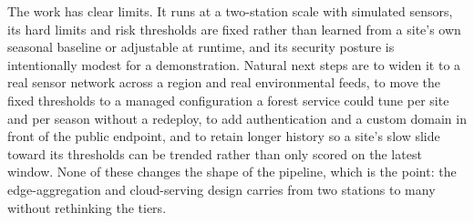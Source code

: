 \documentclass[conference]{IEEEtran}
\begin{document}
The work has clear limits. It runs at a two-station scale with simulated sensors, its hard limits and risk thresholds are fixed rather than learned from a site's own seasonal baseline or adjustable at runtime, and its security posture is intentionally modest for a demonstration. Natural next steps are to widen it to a real sensor network across a region and real environmental feeds, to move the fixed thresholds to a managed configuration a forest service could tune per site and per season without a redeploy, to add authentication and a custom domain in front of the public endpoint, and to retain longer history so a site's slow slide toward its thresholds can be trended rather than only scored on the latest window. None of these changes the shape of the pipeline, which is the point: the edge-aggregation and cloud-serving design carries from two stations to many without rethinking the tiers.
\end{document}
